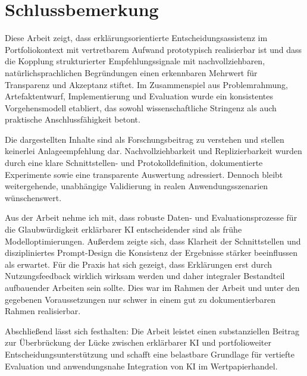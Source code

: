   \section{Schlussbemerkung}

    Diese Arbeit zeigt, dass erklärungsorientierte Entscheidungsassistenz im Portfoliokontext mit vertretbarem Aufwand prototypisch realisierbar ist und dass die Kopplung strukturierter Empfehlungssignale mit nachvollziehbaren, natürlichsprachlichen Begründungen einen erkennbaren Mehrwert für Transparenz und Akzeptanz stiftet.
    Im Zusammenspiel aus Problemrahmung, Artefaktentwurf, Implementierung und Evaluation wurde ein konsistentes Vorgehensmodell etabliert, das sowohl wissenschaftliche Stringenz als auch praktische Anschlussfähigkeit betont.

    Die dargestellten Inhalte sind als Forschungsbeitrag zu verstehen und stellen keinerlei Anlageempfehlung dar.
    Nachvollziehbarkeit und Replizierbarkeit wurden durch eine klare Schnittstellen- und Protokolldefinition, dokumentierte Experimente sowie eine transparente Auswertung adressiert.
    Dennoch bleibt weitergehende, unabhängige Validierung in realen Anwendungsszenarien wünschenswert.

    Aus der Arbeit nehme ich mit, dass robuste Daten- und Evaluationsprozesse für die Glaubwürdigkeit erklärbarer \acs{KI} entscheidender sind als frühe Modelloptimierungen.
    Außerdem zeigte sich, dass Klarheit der Schnittstellen und diszipliniertes Prompt-Design die Konsistenz der Ergebnisse stärker beeinflussen als erwartet.
    Für die Praxis hat sich gezeigt, dass Erklärungen erst durch Nutzungsfeedback wirklich wirksam werden und daher integraler Bestandteil aufbauender Arbeiten sein sollte.
    Dies war im Rahmen der Arbeit und unter den gegebenen Voraussetzungen nur schwer in einem gut zu dokumentierbaren Rahmen realisierbar.

    Abschließend lässt sich festhalten:
    Die Arbeit leistet einen substanziellen Beitrag zur Überbrückung der Lücke zwischen erklärbarer \acs{KI} und portfolioweiter Entscheidungsunterstützung und schafft eine belastbare Grundlage für vertiefte Evaluation und anwendungsnahe Integration von \acs{KI} im Wertpapierhandel.


